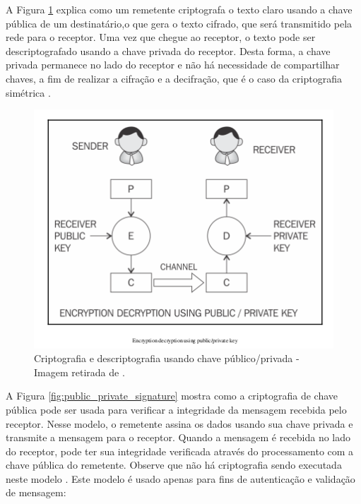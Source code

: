                 A Figura \ref{fig:public_private_encryption} explica como um remetente criptografa o texto claro usando a chave pública de um destinatário,o que gera o texto cifrado, que será transmitido pela rede para o receptor. Uma vez que chegue ao receptor, o texto pode ser descriptografado usando a chave privada do receptor. Desta forma, a chave privada permanece no lado do receptor e não há necessidade de compartilhar chaves, a fim de realizar a cifração e a decifração, que é o caso da criptografia simétrica \cite{mastering_blockchain}.

                    \begin{figure}[H]
                         \centering
                         \includegraphics[scale=0.6]{figuras/capitulo_2/public_private_encryption.png}
                         \caption{Criptografia e descriptografia usando chave público/privada - Imagem retirada de \cite{mastering_blockchain}.}
                         \label{fig:public_private_encryption}
                    \end{figure}
                    
                    
                A Figura \ref{fig:public_private_signature} mostra como a criptografia de chave pública pode ser usada para verificar a integridade da mensagem recebida pelo receptor. Nesse modelo, o remetente assina os dados usando sua chave privada e transmite a mensagem para o receptor. Quando a mensagem é recebida no lado do receptor, pode ter sua integridade verificada através do processamento com a chave pública do remetente. Observe que não há criptografia sendo executada neste modelo \cite{mastering_blockchain}. Este modelo é usado apenas para fins de autenticação e validação de mensagem:
                    
